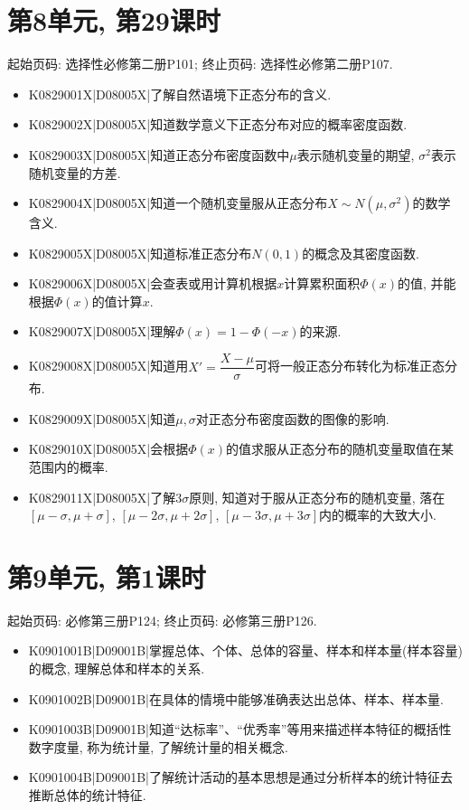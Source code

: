 \section*{第8单元, 第29课时}
起始页码: 选择性必修第二册P101; 终止页码: 选择性必修第二册P107.
\begin{itemize}
\item K0829001X|D08005X|了解自然语境下正态分布的含义.
\item K0829002X|D08005X|知道数学意义下正态分布对应的概率密度函数.
\item K0829003X|D08005X|知道正态分布密度函数中$\mu$表示随机变量的期望, $\sigma^2$表示随机变量的方差.
\item K0829004X|D08005X|知道一个随机变量服从正态分布$X\sim N(\mu,\sigma^2)$的数学含义.
\item K0829005X|D08005X|知道标准正态分布$N(0,1)$的概念及其密度函数.
\item K0829006X|D08005X|会查表或用计算机根据$x$计算累积面积$\Phi(x)$的值, 并能根据$\Phi(x)$的值计算$x$.
\item K0829007X|D08005X|理解$\Phi(x)=1-\Phi(-x)$的来源.
\item K0829008X|D08005X|知道用$X'=\dfrac{X-\mu}{\sigma}$可将一般正态分布转化为标准正态分布.
\item K0829009X|D08005X|知道$\mu,\sigma$对正态分布密度函数的图像的影响.
\item K0829010X|D08005X|会根据$\Phi(x)$的值求服从正态分布的随机变量取值在某范围内的概率.
\item K0829011X|D08005X|了解$3\sigma$原则, 知道对于服从正态分布的随机变量, 落在$[\mu-\sigma,\mu+\sigma]$, $[\mu-2\sigma,\mu+2\sigma]$, $[\mu-3\sigma,\mu+3\sigma]$内的概率的大致大小.
\end{itemize}

\section*{第9单元, 第1课时}
起始页码: 必修第三册P124; 终止页码: 必修第三册P126.
\begin{itemize}
\item K0901001B|D09001B|掌握总体、个体、总体的容量、样本和样本量(样本容量)的概念, 理解总体和样本的关系.
\item K0901002B|D09001B|在具体的情境中能够准确表达出总体、样本、样本量.
\item K0901003B|D09001B|知道``达标率''、``优秀率''等用来描述样本特征的概括性数字度量, 称为统计量, 了解统计量的相关概念.
\item K0901004B|D09001B|了解统计活动的基本思想是通过分析样本的统计特征去推断总体的统计特征.
\end{itemize}

